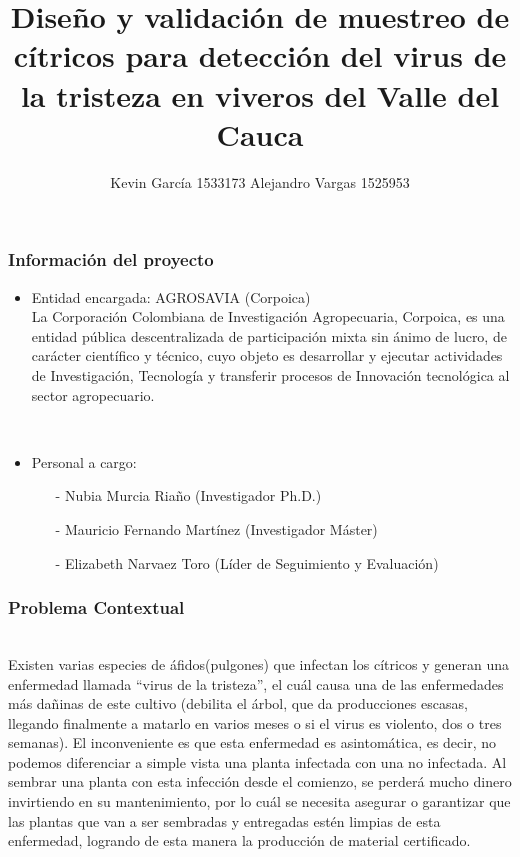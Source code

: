 \documentclass[12pt]{beamer}
\author[Kevin García - Alejandro Vargas]{Kevin García 1533173 \newline Alejandro Vargas 1525953}
\title[Anteproyecto]{Diseño y validación de muestreo de cítricos para detección del virus de la tristeza en viveros del Valle del Cauca}
\begin{document}
\justify
\begin{frame}
\titlepage
\end{frame}

\begin{frame}
\frametitle{Información del proyecto}
\begin{itemize}
\item Entidad encargada: AGROSAVIA (Corpoica)
~\\La Corporación Colombiana de Investigación Agropecuaria, Corpoica, es una entidad pública descentralizada de participación mixta sin ánimo de lucro, de carácter científico y técnico, cuyo objeto es desarrollar y ejecutar actividades de Investigación, Tecnología y transferir procesos de Innovación tecnológica al sector agropecuario.

~\\
\item Personal a cargo:
\begin{itemize}
\item[-]Nubia Murcia Riaño (Investigador Ph.D.)
\item[-]Mauricio Fernando Martínez (Investigador Máster)
\item[-]Elizabeth Narvaez Toro (Líder de Seguimiento y Evaluación)
\end{itemize}
\end{itemize}
\end{frame}


\begin{frame}
\frametitle{Problema Contextual}
~\\Existen varias especies de áfidos(pulgones) que infectan los cítricos y generan una enfermedad llamada ``virus de la tristeza'', el cuál causa una de las enfermedades más dañinas de este cultivo (debilita el árbol, que da producciones escasas, llegando finalmente a matarlo en varios meses o si el virus es violento, dos o tres semanas). El inconveniente es que esta enfermedad es asintomática, es decir, no podemos diferenciar a simple vista una planta infectada con una no infectada. Al sembrar una planta con esta infección desde el comienzo, se perderá mucho dinero invirtiendo en su mantenimiento, por lo cuál se necesita asegurar o garantizar que las plantas que van a ser sembradas y entregadas estén limpias de esta enfermedad, logrando de esta manera la producción de material certificado.
\end{frame}
\end{document}
